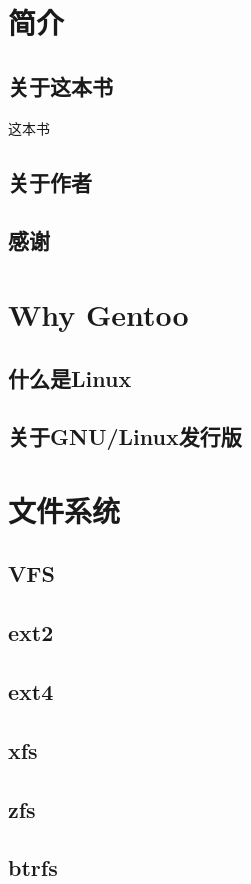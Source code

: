 \chapter{简介}
\section{关于这本书}
这本书
\section{关于作者}
\section{感谢}

\chapter{Why Gentoo}
\section{什么是Linux}
\section{关于GNU/Linux发行版}

\chapter{文件系统}
\section{VFS}
\section{ext2}
\section{ext4}
\section{xfs}
\section{zfs}
\section{btrfs}

